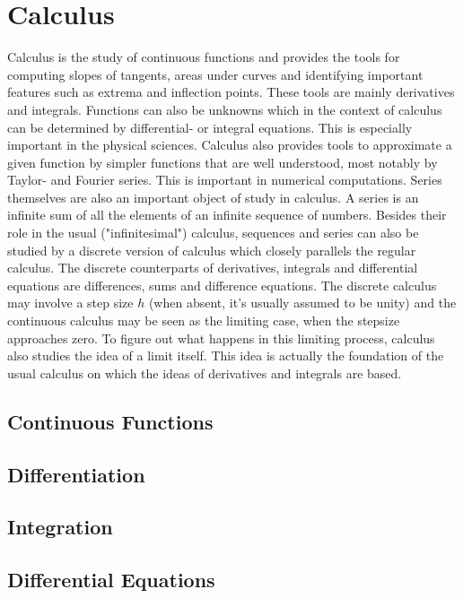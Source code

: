 \documentclass[12pt]{article}  %
\begin{document}
\section{Calculus}
Calculus is the study of continuous functions and provides the tools for computing slopes of tangents, areas under curves and identifying important features such as extrema and inflection points. These tools are mainly derivatives and integrals. Functions can also be unknowns which in the context of calculus can be determined by differential- or integral equations. This is especially important in the physical sciences. Calculus also provides tools to approximate a given function by simpler functions that are well understood, most notably by Taylor- and Fourier series. This is important in numerical computations. Series themselves are also an important object of study in calculus. A series is an infinite sum of all the elements of an infinite sequence of numbers. Besides their role in the usual ("infinitesimal") calculus, sequences and series can also be studied by a discrete version of calculus which closely parallels the regular calculus. The discrete counterparts of derivatives, integrals and differential equations are differences, sums and difference equations. The discrete calculus may involve a step size $h$ (when absent, it's usually assumed to be unity) and the continuous calculus may be seen as the limiting case, when the stepsize approaches zero. To figure out what happens in this limiting process, calculus also studies the idea of a limit itself. This idea is actually the foundation of the usual calculus on which the ideas of derivatives and integrals are based.
\subsection{Continuous Functions}
  
\subsection{Differentiation}
 
\subsection{Integration} 
  
\subsection{Differential Equations}
\end{document}

